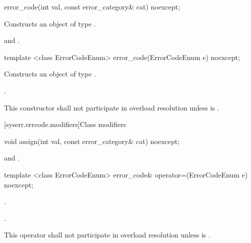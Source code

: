 \begin{itemdecl}
error_code(int val, const error_category& cat) noexcept;
\end{itemdecl}

\begin{itemdescr}
\pnum
\effects Constructs an object of type .

\pnum
\postconditions {} and .
\end{itemdescr}

\begin{itemdecl}
template <class ErrorCodeEnum>
  error_code(ErrorCodeEnum e) noexcept;
\end{itemdecl}

\begin{itemdescr}
\pnum
\effects Constructs an object of type .

\pnum
\postconditions {}.

\pnum
\remarks This constructor shall not participate in overload resolution unless\linebreak
{} is .
\end{itemdescr}

[syserr.errcode.modifiers]{Class  modifiers}

\begin{itemdecl}
void assign(int val, const error_category& cat) noexcept;
\end{itemdecl}

\begin{itemdescr}
\pnum
\postconditions {} and .
\end{itemdescr}

\begin{itemdecl}
template <class ErrorCodeEnum>
    error_code& operator=(ErrorCodeEnum e) noexcept;
\end{itemdecl}

\begin{itemdescr}
\pnum
\postconditions {}.

\pnum
\returns {}.

\pnum
\remarks This operator shall not participate in overload resolution unless\linebreak
{} is .
\end{itemdescr}

